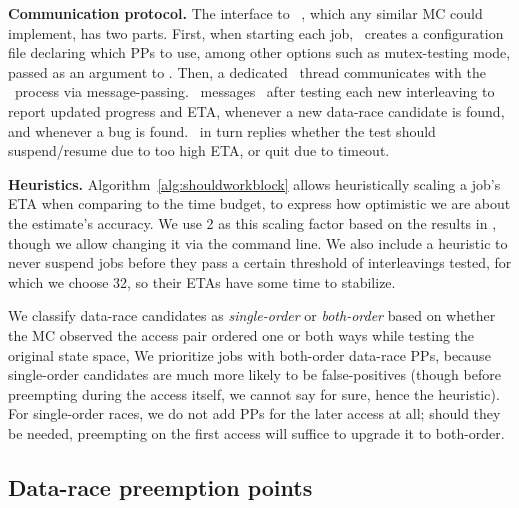 {\bf Communication protocol.}
The interface to \landslide~, which any similar MC could implement, has two parts.
First, when starting each job, \quicksand~creates a configuration file declaring which PPs to use,
among other options such as mutex-testing mode,
passed as an argument to \landslide.
Then, a dedicated \quicksand~thread communicates with the \landslide~process via message-passing.%
\landslide~messages \quicksand~after testing each new interleaving to report updated progress and ETA,
whenever a new data-race candidate is found, and whenever a bug is found.
\quicksand~in turn replies whether the test should suspend/resume due to too high ETA, or quit due to timeout.

{\bf Heuristics.}
Algorithm~\ref{alg:shouldworkblock} allows heuristically scaling a job's ETA when comparing to the time budget,
to express how optimistic we are about the estimate's accuracy.
We use 2 as this scaling factor based on the results in \cite{estimation},
though we allow changing it via the command line.
We also include a heuristic to
never suspend jobs before they pass a certain threshold of interleavings tested,
for which we choose 32,
so their ETAs have some time to stabilize.

We classify data-race candidates as {\em single-order} or {\em both-order} \cite{portend}
based on whether the MC observed the access pair ordered one or both ways while testing the original state space,
We prioritize jobs with both-order data-race PPs,
because single-order candidates are much more likely to be false-positives
(though before preempting during the access itself, we cannot say for sure, hence the heuristic).
For single-order races, we do not add PPs for the later access at all;
should they be needed, preempting on the first access will suffice to upgrade it to both-order.


\subsection{Data-race preemption points}

